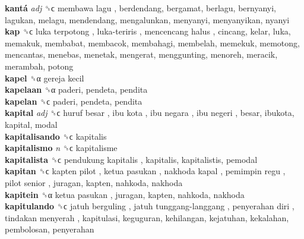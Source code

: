 \textbf{kantá} \emph{adj}  ␝ϲ   membawa lagu , berdendang, bergamat, berlagu, bernyanyi, lagukan, melagu, mendendang, mengalunkan, menyanyi, menyanyikan, nyanyi  \\
\textbf{kap} ␝ϲ   luka terpotong ,  luka-teriris ,  mencencang halus , cincang, kelar, luka, memakuk, membabat, membacok, membahagi, membelah, memekuk, memotong, mencantas, menebas, menetak, mengerat, menggunting, menoreh, meracik, merambah, potong  \\
\textbf{kapel} ␝α   gereja kecil   \\
\textbf{kapelaan} ␝α  paderi, pendeta, pendita  \\
\textbf{kapelan} ␝ϲ  paderi, pendeta, pendita  \\
\textbf{kapital} \emph{adj}  ␝ϲ   huruf besar ,  ibu kota ,  ibu negara ,  ibu negeri , besar, ibukota, kapital, modal  \\
\textbf{kapitalisando} ␝ϲ  kapitalis  \\
\textbf{kapitalismo} \emph{n}  ␝ϲ  kapitalisme  \\
\textbf{kapitalista} ␝ϲ   pendukung kapitalis , kapitalis, kapitalistis, pemodal  \\
\textbf{kapitan} ␝ϲ   kapten pilot ,  ketua pasukan ,  nakhoda kapal ,  pemimpin regu ,  pilot senior , juragan, kapten, nahkoda, nakhoda  \\
\textbf{kapitein} ␝α   ketua pasukan , juragan, kapten, nahkoda, nakhoda  \\
\textbf{kapitulando} ␝ϲ   jatuh berguling ,  jatuh tunggang-langgang ,  penyerahan diri ,  tindakan menyerah , kapitulasi, keguguran, kehilangan, kejatuhan, kekalahan, pembolosan, penyerahan  \\
